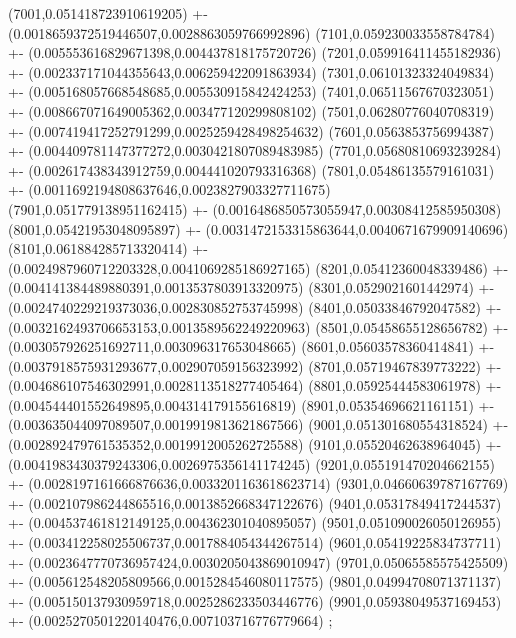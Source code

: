 {(7001,0.051418723910619205) +- (0.0018659372519446507,0.0028863059766992896)
(7101,0.059230033558784784) +- (0.005553616829671398,0.004437818175720726)
(7201,0.059916411455182936) +- (0.002337171044355643,0.006259422091863934)
(7301,0.06101323324049834) +- (0.005168057668548685,0.005530915842424253)
(7401,0.06511567670323051) +- (0.008667071649005362,0.003477120299808102)
(7501,0.06280776040708319) +- (0.007419417252791299,0.0025259428498254632)
(7601,0.0563853756994387) +- (0.004409781147377272,0.0030421807089483985)
(7701,0.05680810693239284) +- (0.002617438343912759,0.004441020793316368)
(7801,0.05486135579161031) +- (0.0011692194808637646,0.0023827903327711675)
(7901,0.051779138951162415) +- (0.0016486850573055947,0.00308412585950308)
(8001,0.05421953048095897) +- (0.0031472153315863644,0.0040671679909140696)
(8101,0.061884285713320414) +- (0.0024987960712203328,0.0041069285186927165)
(8201,0.05412360048339486) +- (0.004141384489880391,0.0013537803913320975)
(8301,0.0529021601442974) +- (0.0024740229219373036,0.002830852753745998)
(8401,0.05033846792047582) +- (0.0032162493706653153,0.0013589562249220963)
(8501,0.05458655128656782) +- (0.003057926251692711,0.003096317653048665)
(8601,0.05603578360414841) +- (0.0037918575931293677,0.002907059156323992)
(8701,0.05719467839773222) +- (0.004686107546302991,0.0028113518277405464)
(8801,0.05925444583061978) +- (0.004544401552649895,0.004314179155616819)
(8901,0.05354696621161151) +- (0.003635044097089507,0.0019919813621867566)
(9001,0.051301680554318524) +- (0.002892479761535352,0.0019912005262725588)
(9101,0.05520462638964045) +- (0.0041983430379243306,0.0026975356141174245)
(9201,0.055191470204662155) +- (0.0028197161666876636,0.0033201163618623714)
(9301,0.04660639787167769) +- (0.002107986244865516,0.0013852668347122676)
(9401,0.05317849417244537) +- (0.004537461812149125,0.004362301040895057)
(9501,0.051090026050126955) +- (0.003412258025506737,0.0017884054344267514)
(9601,0.05419225834737711) +- (0.0023647770736957424,0.0030205043869010947)
(9701,0.05065585575425509) +- (0.005612548205809566,0.0015284546080117575)
(9801,0.04994708071371137) +- (0.005150137930959718,0.0025286233503446776)
(9901,0.05938049537169453) +- (0.0025270501220140476,0.007103716776779664)
};
